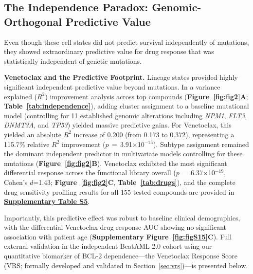 \documentclass[11pt,a4paper]{article}
\newcommand{\pval}[1]{$p$\,$=$\,#1}
\begin{document}
\subsection{The Independence Paradox: Genomic-Orthogonal Predictive Value}

Even though these cell states did not predict survival independently of mutations, they showed extraordinary predictive value for drug response that was statistically independent of genetic mutations.

\textbf{Venetoclax and the Predictive Footprint.} Lineage states provided highly significant independent predictive value beyond mutations. In a variance explained ($R^2$) improvement analysis across top compounds (\textbf{Figure~\ref{fig:fig2}A}; \textbf{Table~\ref{tab:independence}}), adding cluster assignment to a baseline mutational model (controlling for 11 established genomic alterations including \textit{NPM1}, \textit{FLT3}, \textit{DNMT3A}, and \textit{TP53}) yielded massive predictive gains. For Venetoclax, this yielded an absolute $R^2$ increase of 0.200 (from 0.173 to 0.372), representing a 115.7\% relative $R^2$ improvement (\pval{3.91$\times$10$^{-15}$}). Subtype assignment remained the dominant independent predictor in multivariate models controlling for these mutations (\textbf{Figure~\ref{fig:fig2}B}). Venetoclax exhibited the most significant differential response across the functional library overall (\pval{6.37$\times$10$^{-19}$}, Cohen's $d$=1.43; \textbf{Figure~\ref{fig:fig2}C}, \textbf{Table~\ref{tab:drugs}}), and the complete drug sensitivity profiling results for all 155 tested compounds are provided in \href{Supplementary_Methods.pdf#tab:tabS5}{\textbf{Supplementary Table S5}}.

Importantly, this predictive effect was robust to baseline clinical demographics, with the differential Venetoclax drug-response AUC showing no significant association with patient age (\textbf{Supplementary Figure~\ref{fig:figS15}C}). Full external validation in the independent BeatAML 2.0 cohort using our quantitative biomarker of BCL-2 dependence---the Venetoclax Response Score (VRS; formally developed and validated in Section~\ref{sec:vrs})---is presented below.
\end{document}
